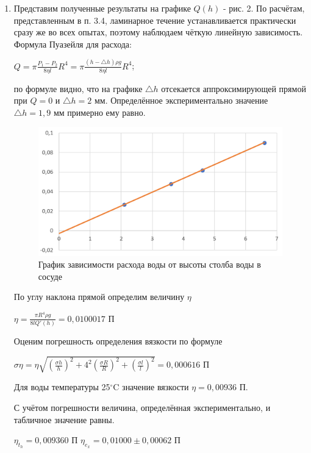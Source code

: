 \documentclass[a4paper]{article}
\begin{document}
\begin{enumerate}
    \item Представим полученные результаты на графике $Q(h)$ - рис. 2. По расчётам, представленным в п. 3.4, ламинарное течение устанавливается практически сразу же во всех опытах, поэтому наблюдаем чёткую линейную зависимость. Формула Пуазейля для расхода:
    \begin{center}
    $Q = \pi \frac{P_1-P_2}{8 \eta l} R^4 = \pi \frac{(h - \triangle h)\rho g}{8 \eta l} R^4$;
    \end{center}
    по формуле видно, что на графике $\triangle h$ отсекается аппроксимирующей прямой при $Q = 0$ и $\triangle h = 2$ мм. Определённое экспериментально значение $\triangle h = 1,9$ мм примерно ему равно.
    
    \begin{figure}[t]
    \centering
    \includegraphics[width=\textwidth]{graph1.PNG}
    \caption{График зависимости расхода воды от высоты столба воды в сосуде}
    \label{fig:vac}
    \end{figure}
    
    По углу наклона прямой определим величину $\eta$
    \begin{center}
    $\eta = \frac{\pi R^4 \rho g}{8 l Q'(h)} = 0,0100017$ П
    \end{center}
    
    Оценим погрешность определения вязкости по формуле
    \begin{center}
    $\sigma \eta = \eta \sqrt{(\frac{\sigma h}{h})^2 + 4^2(\frac{\sigma R}{R})^2 + (\frac{\sigma l}{l})^2} = 0,000616$ П
    \end{center}
    
    Для воды температуры 25$^{\circ} $C значение вязкости $\eta = 0,00936$ П. \par
    С учётом погрешности величина, определённая экспериментально, и табличное значение равны.
    
    \begin{center}
    \fbox
    {$\eta_t_h = 0,009360$ П \hspace{1cm} $\eta_e_x = 0,01000 \pm 0,00062$ П}
    \end{center}

    
\end{enumerate}
\end{document}
